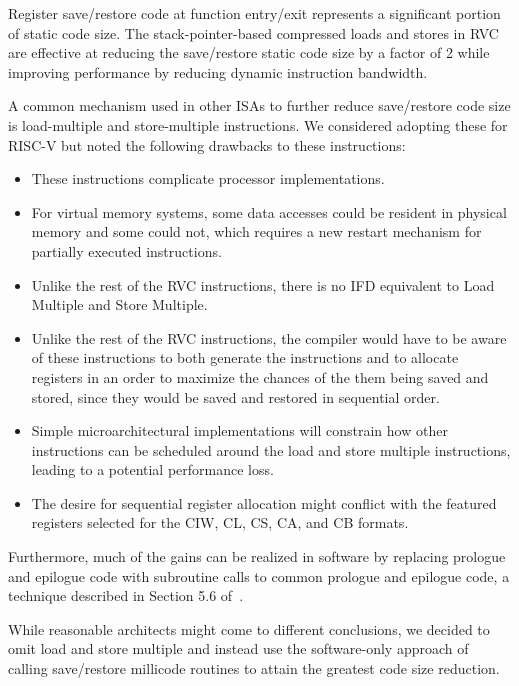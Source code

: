 \begin{commentary}
Register save/restore code at function entry/exit represents a
significant portion of static code size.  The stack-pointer-based
compressed loads and stores in RVC are effective at reducing the
save/restore static code size by a factor of 2 while improving
performance by reducing dynamic instruction bandwidth.

A common mechanism used in other ISAs to further reduce
save/restore code size is load-multiple and store-multiple
instructions.  We considered adopting these for RISC-V but noted the
following drawbacks to these instructions:
\begin{itemize}
\item These instructions complicate processor implementations.
\item For virtual memory systems, some data accesses could be
      resident in physical memory and some could not, which requires a
      new restart mechanism for partially executed instructions.
\item Unlike the rest of the RVC instructions, there is no IFD
      equivalent to Load Multiple and Store Multiple.
\item Unlike the rest of the RVC instructions, the compiler would
      have to be aware of these instructions to both generate the
      instructions and to allocate registers in an order to maximize
      the chances of the them being saved and stored, since they would
      be saved and restored in sequential order.
\item Simple microarchitectural implementations will constrain how
      other instructions can be scheduled around the load and store
      multiple instructions, leading to a potential performance loss.
\item The desire for sequential register allocation might conflict with
      the featured registers selected for the CIW, CL, CS, CA, and CB formats.
\end{itemize}
Furthermore, much of the gains can be realized in software by replacing
prologue and epilogue code with subroutine calls to common
prologue and epilogue code, a technique described in
Section 5.6 of~\cite{waterman-phd}.

While reasonable architects might come to different conclusions, we
decided to omit load and store multiple and instead use the
software-only approach of calling save/restore millicode routines to
attain the greatest code size reduction.
\end{commentary}

